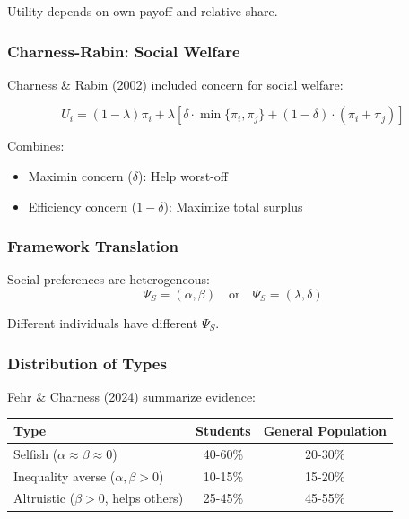 Utility depends on own payoff and relative share.

\subsubsection{Charness-Rabin: Social Welfare}

Charness \& Rabin (2002) included concern for social welfare:

\begin{equation}
\boxed{
U_i = (1-\lambda) \pi_i + \lambda \left[\delta \cdot \min\{\pi_i, \pi_j\} + (1-\delta) \cdot (\pi_i + \pi_j)\right]
}
\label{eq:charness-rabin}
\end{equation}

Combines:
\begin{itemize}
    \item Maximin concern ($\delta$): Help worst-off
    \item Efficiency concern ($1-\delta$): Maximize total surplus
\end{itemize}

\subsubsection{Framework Translation}

Social preferences are heterogeneous:
\begin{equation}
\Psi_S = (\alpha, \beta) \quad \text{or} \quad \Psi_S = (\lambda, \delta)
\end{equation}

Different individuals have different $\Psi_S$.

\subsubsection{Distribution of Types}

Fehr \& Charness (2024) summarize evidence:

\begin{center}
\renewcommand{\arraystretch}{1.3}
\begin{tabular}{|l|c|c|}
\hline
\textbf{Type} & \textbf{Students} & \textbf{General Population} \\
\hline
Selfish ($\alpha \approx \beta \approx 0$) & 40-60\% & 20-30\% \\
Inequality averse ($\alpha, \beta > 0$) & 10-15\% & 15-20\% \\
Altruistic ($\beta > 0$, helps others) & 25-45\% & 45-55\% \\
\hline
\end{tabular}
\end{center}


